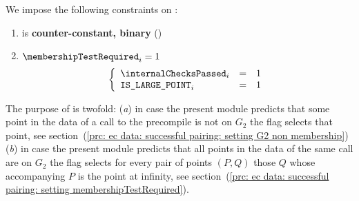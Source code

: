 We impose the following constraints on \membershipTestRequired{}:
\begin{enumerate}
    \item \membershipTestRequired{} is \textbf{counter-constant, binary} \quad (\trash)
    \item \If $\membershipTestRequired_{i} = 1$ \Then
        \[
            \left\{ \begin{array}{lcl}
                \internalChecksPassed _{i} & = & 1 \\
                \isLargePoint_{i}          & = & 1 \\
            \end{array} \right.
        \]
\end{enumerate}
\saNote{} The purpose of \membershipTestRequired{} is twofold:
(\emph{a}) in case the present module predicts that some point in the data of a call to the \instEcpairing{} precompile is not on $G_2$ the \membershipTestRequired{} flag selects that point, see section~(\ref{prc: ec data: successful pairing: setting G2 non membership})
(\emph{b}) in case the present module predicts that all points in the data of the same call are on $G_2$ the \membershipTestRequired{} flag selects for every pair of points $(P,Q)$ those $Q$ whose accompanying $P$ is the point at infinity, see section~(\ref{prc: ec data: successful pairing: setting membershipTestRequired}).
